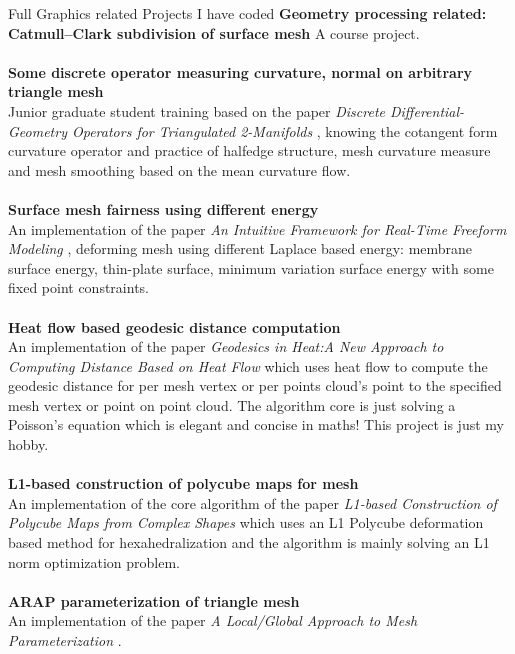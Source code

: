 \documentclass{article} %
\begin{document}
\begin{section}{Full Graphics related Projects I have coded}
         \textbf{Geometry processing related:}\\
                {\bf Catmull–Clark subdivision of surface mesh} A course project.\\\\
                {\bf Some discrete operator measuring  curvature, normal on arbitrary triangle mesh}\\Junior graduate student training based on the paper \emph{Discrete Differential-Geometry Operators for Triangulated 2-Manifolds} \cite{meyer2003discrete}, knowing the cotangent form curvature operator and practice of halfedge structure, mesh curvature measure and mesh smoothing based on the mean curvature flow.\\\\
                {\bf Surface mesh fairness using different energy}\\An implementation of the paper \emph{An Intuitive Framework for Real-Time Freeform Modeling} \cite{botsch2004intuitive}, deforming mesh using different Laplace based energy: membrane surface energy, thin-plate surface, minimum variation surface energy with some fixed point constraints.\\\\
                {\bf Heat flow based geodesic distance computation}\\An implementation of the paper \emph{Geodesics in Heat:A New Approach to Computing Distance Based on Heat Flow} \cite{crane2013geodesics} which uses heat flow to compute the geodesic distance for per mesh vertex or per points cloud's point to the specified mesh vertex or point on point cloud. The algorithm core is just solving a Poisson's equation which is elegant and concise in maths! This project is just my hobby.\\\\
                {\bf L1-based construction of polycube maps for mesh}\\  An implementation of the core algorithm of the paper \emph{L1-based Construction of Polycube Maps from Complex Shapes} \cite{huang2014} which uses an L1 Polycube deformation based method for hexahedralization and the algorithm is mainly solving an L1 norm optimization problem.\\\\
                {\bf ARAP parameterization of triangle mesh}\\An implementation of the paper \emph{A Local/Global Approach to Mesh Parameterization} \cite{liu2008local}.\\\\

\end{section}
\end{document}

